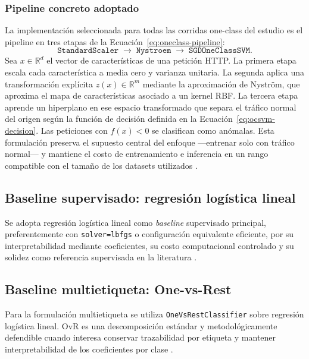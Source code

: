 \documentclass[12pt,oneside]{report}
\begin{document}
\subsubsection{Pipeline concreto adoptado}
La implementación seleccionada para todas las corridas one-class del estudio es el pipeline en tres etapas de la Ecuación~\eqref{eq:oneclass-pipeline}:
\begin{equation}
\label{eq:oneclass-pipeline}
\texttt{StandardScaler} \;\rightarrow\; \texttt{Nystroem} \;\rightarrow\; \texttt{SGDOneClassSVM}.
\end{equation}
Sea $x \in \mathbb{R}^d$ el vector de características de una petición HTTP. La primera etapa escala cada característica a media cero y varianza unitaria. La segunda aplica una transformación explícita $z(x) \in \mathbb{R}^m$ mediante la aproximación de Nyström, que aproxima el mapa de características asociado a un kernel RBF. La tercera etapa aprende un hiperplano en ese espacio transformado que separa el tráfico normal del origen según la función de decisión definida en la Ecuación~\eqref{eq:ocsvm-decision}. Las peticiones con $f(x) < 0$ se clasifican como anómalas. Esta formulación preserva el supuesto central del enfoque ---entrenar solo con tráfico normal--- y mantiene el costo de entrenamiento e inferencia en un rango compatible con el tamaño de los datasets utilizados \cite{sklearn_sgd_ocsvm,sklearn_kernel_approx}.

\subsection{Baseline supervisado: regresión logística lineal}
Se adopta regresión logística lineal como \textit{baseline} supervisado principal, preferentemente con \texttt{solver=lbfgs} o configuración equivalente eficiente, por su interpretabilidad mediante coeficientes, su costo computacional controlado y su solidez como referencia supervisada en la literatura \cite{islr_logreg,sklearn_logreg}.

\subsection{Baseline multietiqueta: One-vs-Rest}
Para la formulación multietiqueta se utiliza \texttt{OneVsRestClassifier} sobre regresión logística lineal. OvR es una descomposición estándar y metodológicamente defendible cuando interesa conservar trazabilidad por etiqueta y mantener interpretabilidad de los coeficientes por clase \cite{tsoumakas_multilabel_overview,rifkin_ova,sklearn_logreg}.
\end{document}
